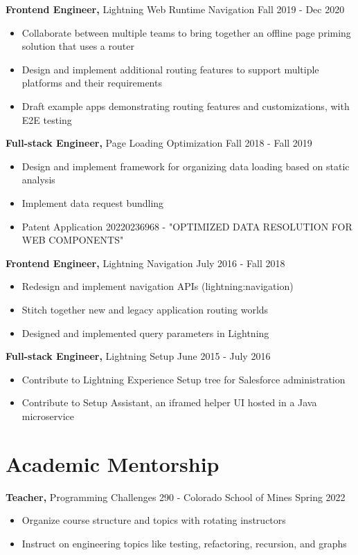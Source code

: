 \documentclass[12pt]{res}
\begin{document}
\begin{resume}
{\bf Frontend Engineer,} Lightning Web Runtime Navigation \hfill Fall 2019 - Dec 2020
\begin{itemize} \itemsep -2pt
    \item Collaborate between multiple teams to bring together an offline page priming solution that uses a router
    \item Design and implement additional routing features to support multiple platforms and their requirements
    \item Draft example apps demonstrating routing features and customizations, with E2E testing
\end{itemize}

{\bf Full-stack Engineer,} Page Loading Optimization \hfill Fall 2018 - Fall 2019
\begin{itemize} \itemsep -2pt
    \item Design and implement framework for organizing data loading based on static analysis
    \item Implement data request bundling
    \item Patent Application 20220236968 - "OPTIMIZED DATA RESOLUTION FOR WEB COMPONENTS"
\end{itemize}

{\bf Frontend Engineer,} Lightning Navigation \hfill July 2016 - Fall 2018
\begin{itemize} \itemsep -2pt
    \item Redesign and implement navigation APIs (lightning:navigation)
    \item Stitch together new and legacy application routing worlds
    \item Designed and implemented query parameters in Lightning
\end{itemize}

{\bf Full-stack Engineer,} Lightning Setup \hfill June 2015 - July 2016
\begin{itemize} \itemsep -2pt
    \item Contribute to Lightning Experience Setup tree for Salesforce administration
    \item Contribute to Setup Assistant, an iframed helper UI hosted in a Java microservice
\end{itemize}

\section{Academic Mentorship}

{\bf Teacher,} Programming Challenges 290 - Colorado School of Mines \hfill Spring 2022
\begin{itemize} \itemsep -2pt
    \item Organize course structure and topics with rotating instructors
    \item Instruct on engineering topics like testing, refactoring, recursion, and graphs
\end{itemize}


\end{resume}
\end{document}

